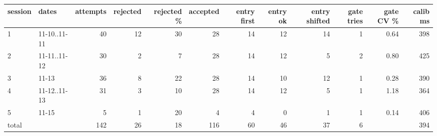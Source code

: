\begin{tabular}{l l r r r r r r r r r r}
\hline
session & dates & attempts & rejected & rejected \% & accepted & entry first & entry ok & entry shifted & gate tries & gate CV \% & calib ms \\
\hline
1 & 11-10..11-11 & 40 & 12 & 30 & 28 & 14 & 12 & 14 & 1 & 0.64 & 398 \\
2 & 11-11..11-12 & 30 & 2 & 7 & 28 & 14 & 12 & 5 & 2 & 0.80 & 425 \\
3 & 11-13 & 36 & 8 & 22 & 28 & 14 & 10 & 12 & 1 & 0.28 & 390 \\
4 & 11-12..11-13 & 31 & 3 & 10 & 28 & 14 & 12 & 5 & 1 & 1.18 & 364 \\
5 & 11-15 & 5 & 1 & 20 & 4 & 4 & 0 & 1 & 1 & 0.14 & 406 \\
\hline
total &  & 142 & 26 & 18 & 116 & 60 & 46 & 37 & 6 &  & 394 \\
\hline
\end{tabular}
